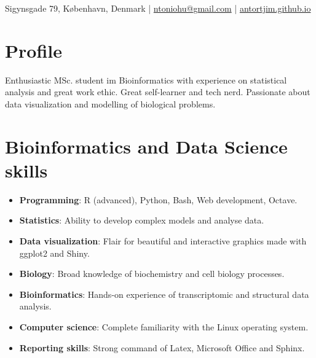 \documentclass[paper=a4,fontsize=11pt]{article}
\newcommand{\sepspace}{\vspace*{1em}}		%
\newcommand{\MyName}[1]{ %
		\Huge \usefont{OT1}{phv}{b}{n} \hfill #1
		\par \normalsize \normalfont}
\newcommand{\MySlogan}[1]{ %
		\large \usefont{OT1}{phv}{m}{n}\hfill \textit{#1}
		\par \normalsize \normalfont}
\newcommand{\NewPart}[1]{\section*{
{#1}}}
\begin{document}

%

\thispagestyle{fancy}



\def\name{}
\centerline{\name}
\vspace{10pt}
\centerline{
Sigynsgade 79, K{\o}benhavn, Denmark
|
\href{mailto:ntoniogu@gmail.com}{ntoniohu@gmail.com}
|
\href{https://antortjim.github.io}{antortjim.github.io}
}


\NewPart{Profile}

Enthusiastic MSc. student im Bioinformatics with experience on statistical analysis and great work ethic. Great self-learner and tech nerd. Passionate about data visualization and modelling of biological problems.


\NewPart{Bioinformatics and Data Science skills}

\begin{itemize}

\item \textbf{Programming}: R (advanced), Python, Bash, Web development, Octave.
\item \textbf{Statistics}: Ability to develop complex models and analyse data.
\item \textbf{Data visualization}: Flair for beautiful and interactive graphics made with ggplot2 and Shiny.
\item \textbf{Biology}: Broad knowledge of biochemistry and cell biology processes.
\item \textbf{Bioinformatics}: Hands-on experience of transcriptomic and structural data analysis.
\item \textbf{Computer science}: Complete familiarity with the Linux operating system.
\item \textbf{Reporting skills}: Strong command of Latex, Microsoft Office and Sphinx.
\end{itemize}
\end{document}
